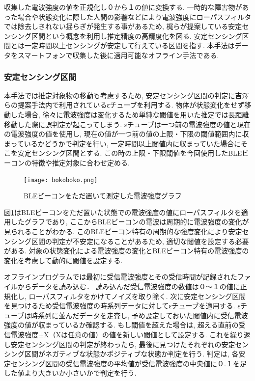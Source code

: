 \documentclass[Japanese]{dicomopapers}
\begin{document}
収集した電波強度の値を正規化し０から１の値に変換する.
一時的な障害物があった場合や状態変化に際した人間の影響などにより電波強度にローパスフィルタでは除去しきれない揺らぎが発生する事があるため, 梶ら\cite{sensing-area}が提案している安定センシング区間という概念を利用し推定精度の高精度化を図る.
安定センシング区間とは一定時間以上センシングが安定して行えている区間を指す.
本手法はデータをスマートフォンで収集した後に適用可能なオフライン手法である.


\subsubsection{安定センシング区間}
本手法では推定対象物の移動も考慮するため, 安定センシング区間の判定に吉澤らの提案手法\cite{ips-chube}内で利用されているεチューブを利用する.
物体が状態変化をせず移動した場合, 徐々に電波強度は変化するため単純な閾値を用いた推定では長距離移動した際に誤判定が起こってしまう.
εチューブは一つ前の電波強度の値と現在の電波強度の値を使用し, 現在の値が一つ前の値の上限・下限の閾値範囲内に収まっているかどうかで判定を行い, 一定時間以上閾値内に収まっていた場合にそこを安定センシング区間とする.
この時の上限・下限閾値を今回使用したBLEビーコンの特徴や推定対象に合わせ定める.
\begin{figure}[ht]
    \centering
    \texttt{[image: bokoboko.png]}
    \caption{BLEビーコンをただ置いて測定した電波強度グラフ}
    \label{nomal-data}
\end{figure}

図\ref{nomal-data}はBLEビーコンをただ置いた状態での電波強度の値にローパスフィルタを適用したグラフであり, ここからBLEビーコンの電波は周期的に電波強度の変化が見られることがわかる.
このBLEビーコン特有の周期的な強度変化により安定センシング区間の判定が不安定になることがあるため, 適切な閾値を設定する必要がある.
対象の状態変化による電波強度の変化とBLEビーコン特有の電波強度の変化を考慮して動的に閾値を設定する.

オフラインプログラムでは最初に受信電波強度とその受信時間が記録されたファイルからデータを読み込む．
読み込んだ受信電波強度の数値は０〜１の値に正規化し, ローパスフィルタをかけてノイズを取り除く.
次に安定センシング区間を見つけるため受信電波強度の時系列データに対してεチューブを適用する.
εチューブは時系列に並んだデータを走査し, 予め設定しておいた閾値内に受信電波強度の値が収まっているか確認する.
もし閾値を超えた場合は, 超える直前の受信電波強度±X（Xは任意の値）の値を新しい閾値として設定する.
これを繰り返し安定センシング区間の判定が終わったら, 最後に見つけたそれぞれの安定センシング区間がネガティブな状態かポジティブな状態か判定を行う.
判定は, 各安定センシング区間の受信電波強度の平均値が受信電波強度の中央値に０.１を足した値より大きいか小さいかで判定を行う.
\end{document}
